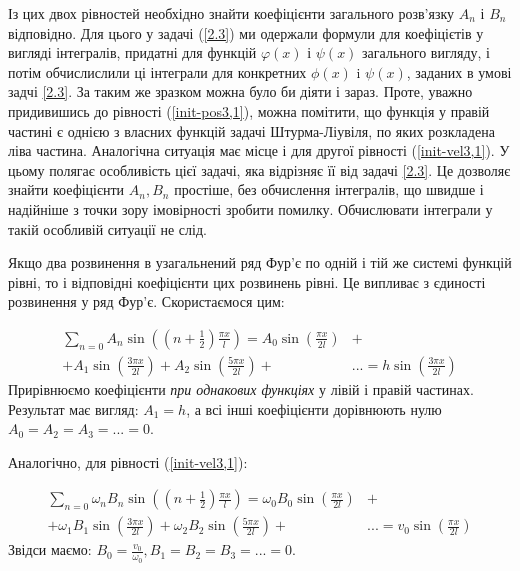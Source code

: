 Із цих двох рівностей необхідно знайти коефіцієнти загального розв'язку $A_n$ і $B_n$ відповідно. Для цього у задачі (\ref{2.3}) ми одержали  формули для коефіцієтів у вигляді інтегралів, придатні для функцій $\varphi(x)$ і $\psi(x)$ загального вигляду, і потім обчислислили ці інтеграли для конкретних $\phi(x)$ i $\psi(x)$, заданих в умові задчі \ref{2.3}. За таким же зразком можна було би діяти і зараз.  Проте, уважно придивишись до рівності (\ref{init-pos3,1}), можна помітити, що функція у правій частині є однією з власних функцій задачі Штурма-Ліувіля, по яких розкладена ліва частина. Аналогічна ситуація має місце і для другої рівності (\ref{init-vel3,1}). У цьому полягає особливість цієї задачі, яка відрізняє її від задачі \ref{2.3}. Це дозволяє знайти коефіцієнти $A_n, B_n$  простіше, без обчислення інтегралів, що швидше і надійніше з точки зору імовірності зробити помилку. Обчислювати інтеграли у такій особливій ситуації не слід.


Якщо два розвинення в узагальнений ряд Фур'є по одній і тій же системі функцій рівні, то і відповідні коефіцієнти цих розвинень рівні. Це випливає з єдиності розвинення у ряд Фур'є. Скористаємося цим:

\begin{equation}
    \begin{aligned}
        \sum_{n=0} A_n \sin \left( (n + \frac{1}{2}) \frac{\pi x}{l} \right) = A_0 \sin \left(\frac{\pi x}{2 l} \right) &+\\
        + A_1 \sin \left(\frac{3 \pi x}{2 l} \right) + A_2 \sin \left(\frac{5 \pi x}{2 l} \right) + &... = h \sin \left( \frac{3 \pi x}{2 l} \right)
    \end{aligned}
\end{equation}
Прирівнюємо коефіцієнти \textit{при однакових функціях} у лівій і правій частинах. Результат має вигляд: $A_1 = h$, а всі інші коефіцієнти дорівнюють нулю $A_0 = A_2 = A_3 = ... = 0$.

Аналогічно, для рівності (\ref{init-vel3,1}): 

\begin{equation}
    \begin{aligned}
        \sum_{n=0} \omega_n B_n \sin \left( (n + \frac{1}{2}) \frac{\pi x}{l} \right) = \omega_0 B_0 \sin \left(\frac{\pi x}{2 l} \right) &+\\
        + \omega_1 B_1 \sin \left(\frac{3 \pi x}{2 l} \right) + \omega_2 B_2 \sin \left(\frac{5 \pi x}{2 l} \right) + &... = v_0 \sin \left( \frac{\pi x}{2 l} \right)
    \end{aligned}
\end{equation}
Звідси маємо: $B_0 = \frac{v_0}{\omega_0}, B_1 = B_2 = B_3 = ... = 0$.

